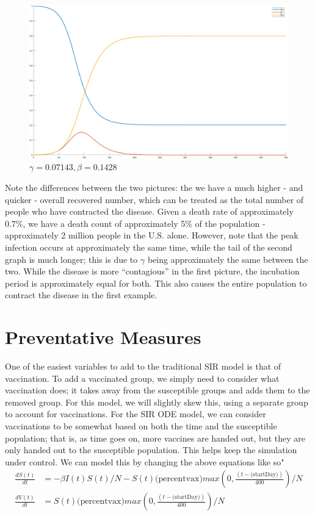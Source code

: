 \documentclass{article}
\begin{document}
\begin{figure}[H]
 \centering
 \includegraphics[scale=0.4]{pic2.png}
 \caption{$\gamma = 0.07143, \beta = 0.1428$}
 \label{fig2}
\end{figure}

Note the differences between the two pictures: the we have a much higher - and quicker - overall recovered number, which can be treated as the total number of people who have contracted the disease. Given a death rate of approximately 0.7\%, we have a death count of approximately 5\% of the population - approximately 2 million people in the U.S. alone. However, note that the peak infection occurs at approximately the same time, while the tail of the second graph is much longer; this is due to $\gamma$ being approximately the same between the two. While the disease is more ``contagious'' in the first picture, the incubation period is approximately equal for both. This also causes the entire population to contract the disease in the first example.

\section{Preventative Measures}
One of the easiest variables to add to the traditional SIR model is that of vaccination. To add a vaccinated group, we simply need to consider what vaccination does; it takes away from the susceptible groups and adds them to the removed group. For this model, we will slightly skew this, using a separate group to account for vaccinations. For the SIR ODE model, we can consider vaccinations to be somewhat based on both the time and the susceptible population; that is, as time goes on, more vaccines are handed out, but they are only handed out to the susceptible population. This helps keep the simulation under control. We can model this by changing the above equations like so"
\begin{align*}
 \frac{dS(t)}{dt} & = -\beta I(t)S(t)/N - S(t)\text{(percentvax)}max(0, \frac{(t-\text{(startDay)})}{400})/N \\
 \frac{dV(t)}{dt} & = S(t)\text{(percentvax)}max(0, \frac{(t-\text{(startDay)})}{400})/N
\end{align*}
\end{document}
